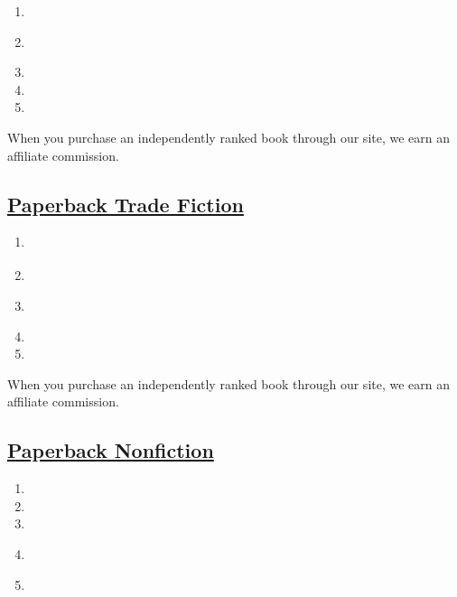 \begin{enumerate}
\def\labelenumi{\arabic{enumi}.}
\tightlist
\item
\item
  \href{https://www.nytimes3xbfgragh.onion/2019/08/20/books/review/how-to-be-an-antiracist-ibram-x-kendi.html}{}
\item
\item
\item
\end{enumerate}

When you purchase an independently ranked book through our site, we earn
an affiliate commission.

\hypertarget{paperback-trade-fiction}{%
\subsection{\texorpdfstring{\href{/books/best-sellers/2020/08/02/trade-fiction-paperback/}{Paperback
Trade
Fiction}}{Paperback Trade Fiction}}\label{paperback-trade-fiction}}

\begin{enumerate}
\def\labelenumi{\arabic{enumi}.}
\tightlist
\item
  \href{https://www.nytimes3xbfgragh.onion/2017/09/25/books/review/little-fires-everywhere-celeste-ng.html}{}
\item
\item
  \href{https://www.nytimes3xbfgragh.onion/2019/07/11/books/review-nickel-boys-colson-whitehead.html}{}
\item
\item
\end{enumerate}

When you purchase an independently ranked book through our site, we earn
an affiliate commission.

\hypertarget{paperback-nonfiction}{%
\subsection{\texorpdfstring{\href{/books/best-sellers/2020/08/02/paperback-nonfiction/}{Paperback
Nonfiction}}{Paperback Nonfiction}}\label{paperback-nonfiction}}

\begin{enumerate}
\def\labelenumi{\arabic{enumi}.}
\tightlist
\item
\item
\item
\item
  \href{https://www.nytimes3xbfgragh.onion/2004/04/22/books/books-of-the-times-inspired-windbag-who-molded-the-us-government.html}{}
\item
\end{enumerate}

